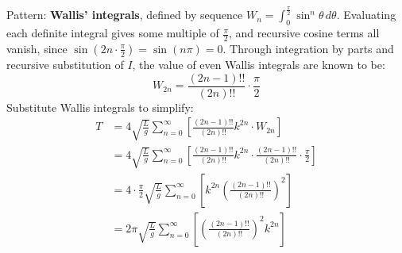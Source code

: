 \documentclass[preview]{standalone}
\begin{document}
\color{white}

Pattern: \textbf{Wallis' integrals}, defined by sequence $W_n =
\int_{0}^{\frac{\pi}{2}} \sin^n \theta \, d\theta$. Evaluating each
definite integral gives some multiple of $\frac{\pi}{2}$, and
recursive cosine terms all vanish, since $\sin(2n \cdot
\frac{\pi}{2}) = \sin(n\pi) = 0$. Through integration by parts and recursive
substitution of $I$, the value of even Wallis integrals are known to be:
\[
  W_{2n} = \frac{(2n-1)!!}{(2n)!!} \cdot \frac{\pi}{2}
\]
Substitute Wallis integrals to simplify:
\begin{align*}
  T &= 4 \sqrt{\frac{L}{g}} \sum_{n=0}^{\infty} \left[\frac{
  (2n-1)!!}{(2n)!!} k^{2n} \cdot W_{2n}\right] \\
  &= 4 \sqrt{\frac{L}{g}} \sum_{n=0}^{\infty} \left[\frac{
    (2n-1)!!}{(2n)!!} k^{2n} \cdot \frac{(2n-1)!!}{(2n)!!} \cdot
  \frac{\pi}{2}\right] \\
  &= 4 \cdot \frac{\pi}{2} \sqrt{\frac{L}{g}} \sum_{n=0}^{\infty}
  \left[ k^{2n} \left(\frac{(2n-1)!!}{(2n)!!}\right)^2 \right] \\
  &= 2\pi \sqrt{\frac{L}{g}} \sum_{n=0}^{\infty} \left[
  \left(\frac{(2n-1)!!}{(2n)!!}\right)^2 k^{2n} \right]
\end{align*}
\end{document}
